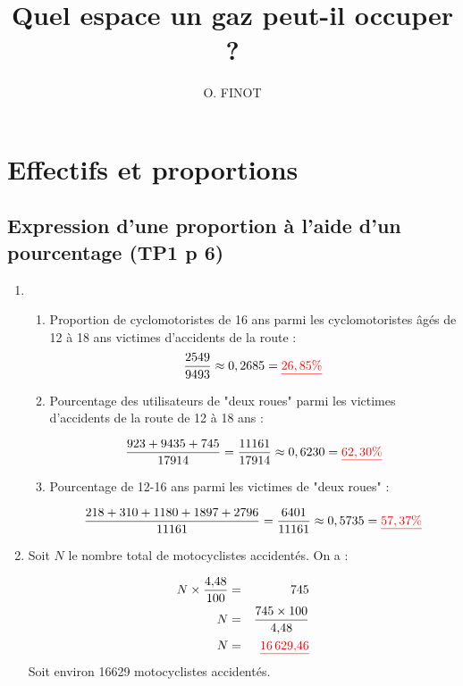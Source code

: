 \documentclass[xcolor={dvipsnames}]{beamer}
\title{Quel espace un gaz peut-il occuper ?}
\author{O. FINOT}\institute{Collège S$^t$ Bernard}
\begin{document}
\begin{frame}
  \titlepage 
\end{frame}


	



\section{Effectifs et proportions}

\subsection{Expression d'une proportion à l'aide d'un pourcentage (TP1 p 6)}

\begin{frame}[allowframebreaks]{}

\begin{enumerate}%
	\item 
	\begin{enumerate} [a]
		\item Proportion de cyclomotoristes de 16 ans parmi les cyclomotoristes âgés de 12 à 18 ans victimes d'accidents de la route :
		\begin{eqnarray*}
			\dfrac{2549}{9493} \approx 0,2685 = \textcolor{red}{\underline{26,85\%}}
		\end{eqnarray*}
		
		\item Pourcentage des utilisateurs de "deux roues" parmi les victimes d'accidents de la route de 12 à 18 ans :
		
		\begin{equation*}
		\dfrac{923 + 9435 + 745}{17914} = \dfrac{11 161}{17914} \approx 0,6230 = \textcolor{red}{\underline{62,30 \%}}
		\end{equation*}
		
		\item Pourcentage de 12-16 ans parmi les victimes de "deux roues" :
		
		\begin{equation*}
		\dfrac{218 + 310 + 1180 + 1897 + 2796}{11161} = \dfrac{6401}{11161} \approx 0,5735 = \textcolor{red}{\underline{57,37 \%}}
		\end{equation*}
	\end{enumerate}
	
	\item Soit $N$ le nombre total de motocyclistes accidentés. On a :
	
	\begin{eqnarray*}
		N \times \dfrac{\num{4.48}}{100} &=& 745 \\
		N &=& \dfrac{745 \times 100}{\num{4.48}} \\
		N &=&  \textcolor{red}{\underline{\textbf{\num{16629.46}}}}
	\end{eqnarray*}
	Soit environ \num{16629} motocyclistes accidentés.
	

\end{enumerate}
\end{frame}
\end{document}
